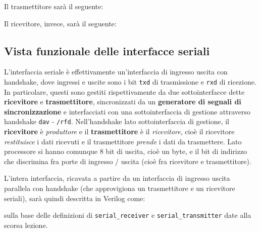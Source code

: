 \documentclass[a4paper,11pt]{article}
\begin{document}
Il trasmettitore sarà il seguente:


Il ricevitore, invece, sarà il seguente:


\subsection{Vista funzionale delle interfacce seriali}
L'interfaccia seriale è effettivamente un'interfaccia di ingresso uscita con handshake, dove ingressi e uscite sono i bit \lstinline|txd| di trasmissione e \lstinline|rxd| di ricezione.
In particolare, questi sono gestiti rispettivamente da due sottointerfacce dette \textbf{ricevitore} e \textbf{trasmettitore}, sincronizzati da un \textbf{generatore di segnali di sincronizzazione} e interfacciati con una sottointerfaccia di gestione attraverso handshake \lstinline|dav| - \lstinline|/rfd|.
Nell'handshake lato sottointerfaccia di gestione, il \textbf{ricevitore} è \textit{produttore} e il \textbf{trasmettitore} è il \textit{ricevitore}, cioè il ricevitore \textit{restituisce} i dati ricevuti e il trasmettitore \textit{prende} i dati da trasmettere.
Lato processore si hanno comunque 8 bit di uscita, cioè un byte, e il bit di indirizzo che discrimina fra porte di ingresso / uscita (cioè fra ricevitore e trasmettitore).

L'intera interfaccia, ricavata a partire da un interfaccia di ingresso uscita parallela con handshake (che approvigiona un trasmettitore e un ricevitore seriali), sarà quindi descritta in Verilog come:

sulla base delle definizioni di \lstinline|serial_receiver| e \lstinline|serial_transmitter| date alla scorsa lezione.
\end{document}
